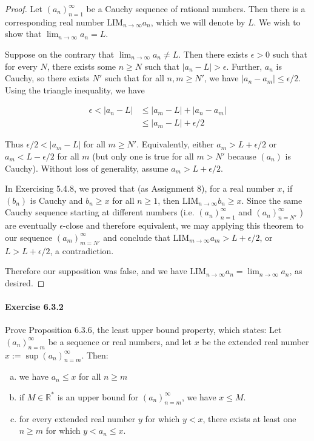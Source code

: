 \documentclass{article}
\newcommand{\real}{{\mathbb{R}}}
\newcommand{\ra}{\rightarrow}
\newcommand{\LIM}{{\mathrm{LIM}}}
\begin{document}
\begin{proof} 
Let $(a_n)_{n=1}^\infty$ be a Cauchy sequence of rational numbers. Then there is a corresponding real number $\LIM_{n \ra \infty} a_n$, which we will denote by $L$. We wish to show that $\lim_{n \ra \infty} a_n = L$.

Suppose on the contrary that $\lim_{n \ra \infty} a_n \neq L$. Then there exists $\epsilon > 0$ such that for every $N$, there exists some $n \geq N$ such that $|a_n - L | > \epsilon$. Further, $a_n$ is Cauchy, so there exists $N'$ such that for all $n,m \geq N'$, we have $|a_n - a_m| \leq \epsilon/2$. Using the triangle inequality, we have

\begin{align*}
\epsilon < |a_n - L| &\leq |a_m - L| + |a_n - a_m| \\
&\leq |a_m - L| + \epsilon/2
\end{align*}

Thus $\epsilon/2 < |a_m - L|$ for all $m \geq N'$. Equivalently, either $a_m > L + \epsilon/2$ or $a_m < L - \epsilon/2$ for all $m$ (but only one is true for all $m > N'$ because $(a_n)$ is Cauchy). Without loss of generality, assume $a_m > L + \epsilon/2$.

In Exercising 5.4.8, we proved that (as Assignment 8), for a real number $x$, if $(b_n)$ is Cauchy and $b_n \geq x$ for all $n \geq 1$, then $\LIM_{n \ra \infty} b_n \geq x$. Since the same Cauchy sequence starting at different numbers (i.e. $(a_n)_{n=1}^\infty$ and $(a_n)_{n=N'}^\infty$ ) are eventually $\epsilon$-close and therefore equivalent, we may applying this theorem to our sequence $(a_m)_{m = N'}^\infty$ and conclude that $\LIM_{m \ra \infty} a_m > L + \epsilon/2$, or $L > L + \epsilon/2$, a contradiction.

Therefore our supposition was false, and we have $\LIM_{n \ra \infty} a_n = \lim_{n \ra \infty} a_n$, as desired.
\end{proof}

\paragraph{Exercise 6.3.2} Prove Proposition 6.3.6, the least upper bound property, which states: Let $(a_n)_{n=m}^\infty$ be a sequence or real numbers, and let $x$ be the extended real number $x := \sup (a_n)_{n=m}^\infty$. Then:

\begin{enumerate}[a)]
    \item we have $a_n \leq x$ for all $ n \geq m$
    \item if $M \in \real^*$ is an upper bound for $(a_n)_{n=m}^\infty$, we have $x \leq M$.
    \item for every extended real number $y$ for which $y < x$, there exists at least one $n \geq m$ for which $y < a_n \leq x$.
\end{enumerate}
\end{document}

